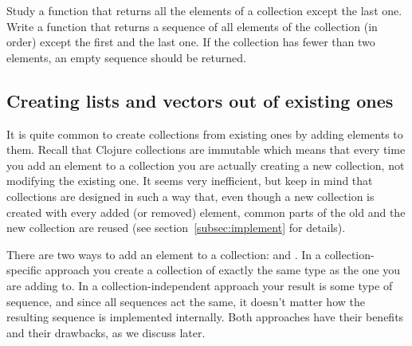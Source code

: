 \begin{exercise}\label{ex:butlast}
Study a function  that returns all the elements of a collection except the last one. Write a function  that returns a sequence of all elements of the collection (in order) except the first and the last one. If the collection has fewer than two elements, an empty sequence should be returned.  
\end{exercise}

\subsection{Creating lists and vectors out of existing ones}\label{subsec:conj-lists-vectors}
It is quite common to create collections from existing ones by adding elements to them. Recall that Clojure collections are immutable which means that every time you add an element to a collection  you are actually creating a new collection, not modifying the existing one. %
It seems very inefficient, but keep in mind that collections are designed in such a way that, even though a new collection is created with every added (or removed) element, common parts of the old and the new collection are reused (see section~\ref{subsec:implement} for details).  

There are two ways to add an element to a collection:  and . In a collection-specific approach you create a collection of exactly the same type as the one you are adding to. In a collection-independent approach your result is some type of  sequence, and since all sequences act the same, it doesn't matter how the resulting sequence is implemented internally.  Both approaches have their benefits and their drawbacks, as we discuss later. 

